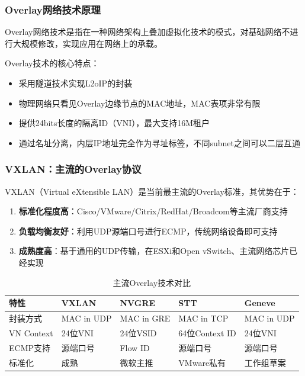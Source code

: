 \subsubsection{Overlay网络技术原理}

Overlay网络技术是指在一种网络架构上叠加虚拟化技术的模式，对基础网络不进行大规模修改，实现应用在网络上的承载。

Overlay技术的核心特点：
\begin{itemize}
    \item 采用隧道技术实现L2oIP的封装
    \item 物理网络只看见Overlay边缘节点的MAC地址，MAC表项非常有限
    \item 提供24bits长度的隔离ID（VNI），最大支持16M租户
    \item 通过名址分离，内层IP地址完全作为寻址标签，不同subnet之间可以二层互通
\end{itemize}

\subsubsection{VXLAN：主流的Overlay协议}

VXLAN（Virtual eXtensible LAN）是当前最主流的Overlay标准，其优势在于：

\begin{enumerate}
    \item \textbf{标准化程度高}：Cisco/VMware/Citrix/RedHat/Broadcom等主流厂商支持
    \item \textbf{负载均衡友好}：利用UDP源端口号进行ECMP，传统网络设备即可支持
    \item \textbf{成熟度高}：基于通用的UDP传输，在ESXi和Open vSwitch、主流网络芯片已经实现
\end{enumerate}

\begin{table}[htbp]
\centering
\caption{主流Overlay技术对比}
\begin{tabular}{|l|l|l|l|l|}
\hline
\textbf{特性} & \textbf{VXLAN} & \textbf{NVGRE} & \textbf{STT} & \textbf{Geneve} \\
\hline
封装方式 & MAC in UDP & MAC in GRE & MAC in TCP & MAC in UDP \\
\hline
VN Context & 24位VNI & 24位VSID & 64位Context ID & 24位VNI \\
\hline
ECMP支持 & 源端口号 & Flow ID & 源端口号 & 源端口号 \\
\hline
标准化 & 成熟 & 微软主推 & VMware私有 & 工作组草案 \\
\hline
\end{tabular}
\end{table}

